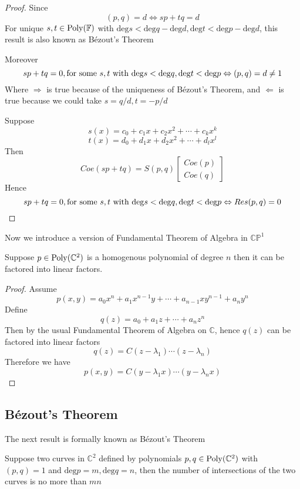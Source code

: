 \begin{proof}
Since
$$ (p,q) = d \Leftrightarrow sp + tq = d $$
For unique $ s,t \in \operatorname{Poly}(\mathbb{F}) $ with $ \mathrm{deg}s < \mathrm{deg}q - \mathrm{deg}d, 
\mathrm{deg}t < \mathrm{deg}p - \mathrm{deg}d $, this result is also known as B\'ezout's Theorem \par
Moreover
$$ sp + tq = 0, \text{for some $ s,t $ with $ \mathrm{deg}s < \mathrm{deg}q, \mathrm{deg}t < \mathrm{deg}p $} 
\Leftrightarrow (p,q) = d \neq 1 $$
Where $ \Rightarrow $ is true because of the uniqueness of B\'ezout's Theorem, and $ \Leftarrow $ is true because we could take $ s = q/d, t = -p/d $ \par
Suppose
$$ s(x) = c_{0} + c_{1}x + c_{2}x^{2} + \cdots + c_{k}x^{k} $$
$$ t(x) = d_{0} + d_{1}x + d_{2}x^{2} + \cdots + d_{l}x^{l} $$
Then
$$ Coe(sp + tq) = S(p,q) \left[ \begin{matrix} Coe(p) \\ Coe(q) \end{matrix} \right] $$
Hence
$$ sp + tq = 0, \text{for some $ s,t $ with $ \mathrm{deg}s < \mathrm{deg}q, \mathrm{deg}t < \mathrm{deg}p $} 
\Leftrightarrow Res(p,q) = 0 $$
\end{proof}

Now we introduce a version of Fundamental Theorem of Algebra in $ \mathbb{CP}^{1} $

\begin{theorem}\label{theorem 21}
Suppose $ p \in \operatorname{Poly}(\mathbb{C}^{2}) $ is a homogenous polynomial of degree $ n $ then it can be factored 
into linear factors.
\end{theorem}

\begin{proof}
Assume
$$ p(x,y) = a_{0}x^{n} + a_{1}x^{n-1}y + \cdots + a_{n-1}xy^{n-1} + a_{n}y^{n} $$
Define
$$ q(z) = a_{0} + a_{1}z + \cdots + a_{n}z^{n} $$
Then by the usual Fundamental Theorem of Algebra on $ \mathbb{C} $, hence $ q(z) $ can be factored into linear factors
$$ q(z) = C(z - \lambda_{1}) \cdots (z - \lambda_{n}) $$
Therefore we have 
$$ p(x,y) = C(y - \lambda_{1}x) \cdots (y - \lambda_{n}x) $$
\end{proof}

\subsection{B\'ezout's Theorem}

The next result is formally known as B\'ezout's Theorem

\begin{theorem}\label{theorem 22}
Suppose two curves in $ \mathbb{C}^{2} $ defined by polynomials $ p,q \in \operatorname{Poly}(\mathbb{C}^{2}) $ with 
$ (p,q) = 1 $ and $ \mathrm{deg}p = m, \mathrm{deg}q = n $, then the number of intersections of the two curves 
is no more than $ mn $
\end{theorem}

